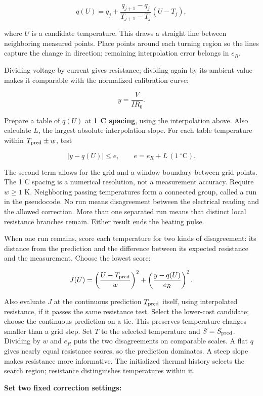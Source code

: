 \documentclass[11pt,letterpaper]{article}
\begin{document}
\[
q(U)=q_j+\frac{q_{j+1}-q_j}{T_{j+1}-T_j}(U-T_j),
\]

where \(U\) is a candidate temperature. This draws a straight line between neighboring measured points. Place points around each turning region so the lines capture the change in direction; remaining interpolation error belongs in \(e_R\).

Dividing voltage by current gives resistance; dividing again by its ambient value makes it comparable with the normalized calibration curve:

\[
y=\frac{V}{I R_0}.
\]

Prepare a table of \(q(U)\) at \textbf{1 \textdegree{}C spacing}, using the interpolation above. Also calculate \(L\), the largest absolute interpolation slope. For each table temperature within \(T_{\rm pred}\pm w\), test

\[
|y-q(U)|\le e,\qquad e=e_R+L\,(1\ ^\circ\mathrm C).
\]

The second term allows for the grid and a window boundary between grid points. The 1 \textdegree{}C spacing is a numerical resolution, not a measurement accuracy. Require \(w\ge1\) K. Neighboring passing temperatures form a connected group, called a run in the pseudocode. No run means disagreement between the electrical reading and the allowed correction. More than one separated run means that distinct local resistance branches remain. Either result ends the heating pulse.

When one run remains, score each temperature for two kinds of disagreement: its distance from the prediction and the difference between its expected resistance and the measurement. Choose the lowest score:

\[
J(U)=\left(\frac{U-T_{\rm pred}}{w}\right)^2+
\left(\frac{y-q(U)}{e_R}\right)^2.
\]

Also evaluate \(J\) at the continuous prediction \(T_{\rm pred}\) itself, using interpolated resistance, if it passes the same resistance test. Select the lower-cost candidate; choose the continuous prediction on a tie. This preserves temperature changes smaller than a grid step. Set \(T\) to the selected temperature and \(S=S_{\rm pred}\). Dividing by \(w\) and \(e_R\) puts the two disagreements on comparable scales. A flat \(q\) gives nearly equal resistance scores, so the prediction dominates. A steep slope makes resistance more informative. The initialized thermal history selects the search region; resistance distinguishes temperatures within it.

\textbf{Set two fixed correction settings:}
\end{document}
